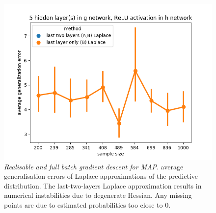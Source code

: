 \documentclass{article} %
\begin{document}
\begin{figure}[h!]
\begin{center}
		\includegraphics[scale=0.35]{laplace_taskid11.png}
	\end{center}
	\caption{\textit{Realisable and full batch gradient descent for MAP}. average generalisation errors of Laplace approximations of the predictive distribution. The last-two-layers Laplace approximation results in numerical instabilities due to degenerate Hessian. Any missing points are due to estimated probabilities too close to 0. 
	}
	\label{fig:avg_gen_err_fullbatch_realisable_laplace}
\end{figure}
\end{document}
